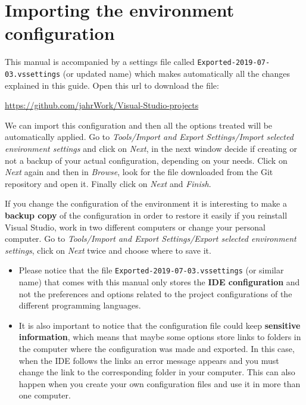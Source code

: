     \vspace{-0.5cm}
    \FloatBarrier
    \section{Importing the environment configuration}
    
This manual is accompanied by a settings file called \texttt{Exported-2019-07-03.vssettings} (or updated name) which makes automatically all the changes explained in this guide. Open this url to download the file:

\url{https://github.com/jahrWork/Visual-Studio-projects}
 
We can import this configuration and then all the options treated will be automatically applied. Go to \textit{Tools/Import and Export Settings/Import selected environment settings} and click on \textit{Next}, in the next window decide if creating or not a backup of your actual configuration, depending on your needs. Click on \textit{Next} again and then in \textit{Browse}, look for the file downloaded from the Git repository and open it. Finally click on \textit{Next} and \textit{Finish}.    
    
If you change the configuration of the environment it is interesting to make a \textbf{backup copy} of the configuration in order to restore it easily if you reinstall Visual Studio, work in two different computers or change your personal computer. Go to \textit{Tools/Import and Export Settings/Export selected environment settings}, click on \textit{Next} twice and choose where to save it.
    
\begin{IN}
    \begin{itemize}
        \item Please notice that the file \texttt{Exported-2019-07-03.vssettings} (or similar name) that comes with this manual only stores the \textbf{IDE configuration} and not the preferences and options related to the project configurations of the different programming languages.
            
        \item It is also important to notice that the configuration file could keep \textbf{sensitive information}, which means that maybe some options store links to folders in the computer where the configuration was made and exported. In this case, when the IDE follows the links an error message appears and you must change the link to the corresponding folder in your computer. This can also happen when you create your own configuration files and use it in more than one computer.  
    \end{itemize}
\end{IN}
    

